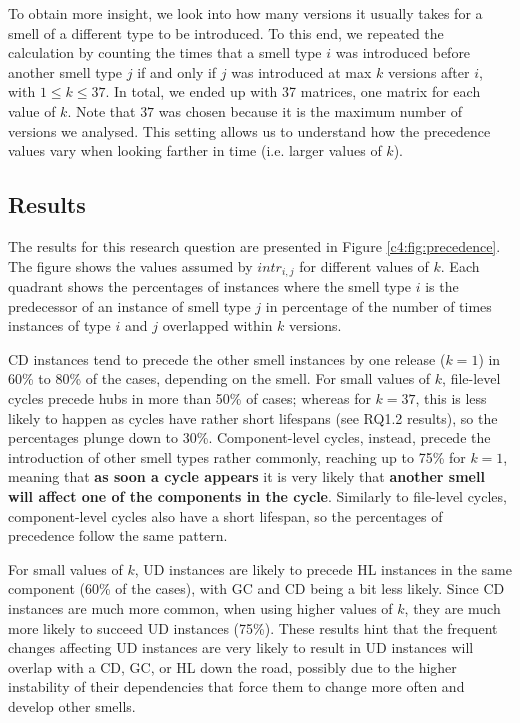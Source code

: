 To obtain more insight, we look into how many versions it usually takes for a smell of a different type to be introduced. To this end, we repeated the calculation by counting the times that a smell type $i$ was introduced before another smell type $j$ if and only if $j$ was introduced at max $k$ versions after $i$, with $1\le k \le 37$. In total, we ended up with 37 matrices, one matrix for each value of $k$. Note that $37$ was chosen because it is the maximum number of versions we analysed. 
This setting allows us to understand how the precedence values vary when looking farther in time (i.e. larger values of $k$).

\subsection{Results}
The results for this research question are presented in Figure \ref{c4:fig:precedence}.
The figure shows the values assumed by $intr_{i,j}$ for different values of $k$. Each quadrant shows the percentages of instances where the smell type $i$ is the predecessor of an instance of smell type $j$ in percentage of the number of times instances of type $i$ and $j$ overlapped within $k$ versions.

CD instances tend to precede the other smell instances by one release ($k = 1$) in 60\% to 80\% of the cases, depending on the smell. For small values of $k$, file-level cycles precede hubs in more than 50\% of cases; whereas for $k = 37$, this is less likely to happen as cycles have rather short lifespans (see RQ1.2 results), so the percentages plunge down to 30\%.
Component-level cycles, instead, precede the introduction of other smell types rather commonly, reaching up to 75\% for $k = 1$, meaning that \textbf{as soon a cycle appears} it is very likely that \textbf{another smell will affect one of the components in the cycle}.
Similarly to file-level cycles, component-level cycles also have a short lifespan, so the percentages of precedence follow the same pattern.

For small values of $k$, UD instances are likely to precede HL instances in the same component (60\% of the cases), with GC and CD being a bit less likely.
Since CD instances are much more common, when using higher values of $k$, they are much more likely to succeed UD instances (75\%).
These results hint that the frequent changes affecting UD instances are very likely to result in UD instances will overlap with a CD, GC, or HL down the road, possibly due to the higher instability of their dependencies that force them to change more often and develop other smells.

